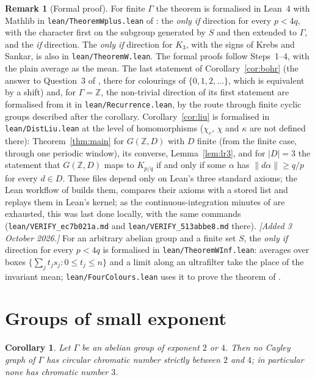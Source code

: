 \documentclass[11pt,a4paper]{amsart}
\newtheorem{corollary}[theorem]{Corollary}
\theoremstyle{definition}
\newtheorem{remark}[theorem]{Remark}
\newcommand{\Z}{\mathbb{Z}}
\begin{document}
\begin{remark}[Formal proof]\label{rem:lean}
For finite $\Gamma$ the theorem is formalised in Lean~4 with Mathlib in \texttt{lean/TheoremWplus.lean} of
\cite{Repo}: the \emph{only if} direction for every $p<4q$, with the character first on the subgroup generated by
$S$ and then extended to $\Gamma$, and the \emph{if} direction. The \emph{only if} direction for $K_3$, with the signs
of Krebs and Sankar, is also in \texttt{lean/TheoremW.lean}. The formal proofs follow Steps~1--4, with the plain
average as the mean. The last statement of Corollary~\ref{cor:bohr} (the answer to Question~3 of \cite{GKR}, there for colourings of
$\{0,1,2,\dots\}$, which is equivalent by a shift) and,
for $\Gamma=\Z$, the non-trivial direction of its first statement are formalised from it in
\texttt{lean/Recurrence.lean}, by the route through finite cyclic groups described after the corollary. Corollary~\ref{cor:liu}
is formalised in \texttt{lean/DistLiu.lean} at the level of homomorphisms ($\chi_c$, $\chi$ and $\kappa$ are not
defined there): Theorem~\ref{thm:main} for
$G(\Z,D)$ with $D$ finite (from the finite case, through one periodic window), its converse, Lemma~\ref{lem:lr3},
and for $|D|=3$ the statement that $G(\Z,D)$ maps to $K_{p/q}$ if and only if some $\alpha$ has
$\|d\alpha\|\ge q/p$ for every $d\in D$. These files depend
only on Lean's three standard axioms; the Lean workflow of \cite{Repo} builds them, compares their axioms with a
stored list and replays them in Lean's kernel; as the continuous-integration minutes of \cite{Repo} are exhausted,
this was last done locally, with the same commands (\texttt{lean/VERIFY\_ec7b021a.md} and
\texttt{lean/VERIFY\_513abbe8.md} there). \emph{[Added 3 October 2026.]} For an arbitrary abelian group and a
finite set $S$, the \emph{only if} direction for every $p<4q$ is formalised in \texttt{lean/TheoremWInf.lean}:
averages over boxes $\{\sum_j t_j s_j : 0\le t_j\le n\}$ and a limit along an ultrafilter take the place of the
invariant mean; \texttt{lean/FourColours.lean} uses it to prove the theorem of \cite{FC}.
\end{remark}

\section{Groups of small exponent}\label{sec:exp}

\begin{corollary}\label{cor:exp}
Let $\Gamma$ be an abelian group of exponent $2$ or $4$. Then no Cayley graph of $\Gamma$ has circular chromatic
number strictly between $2$ and $4$; in particular none has chromatic number $3$.
\end{corollary}
\end{document}
